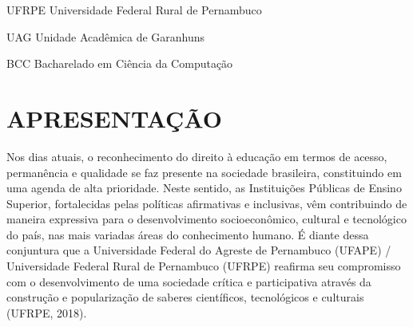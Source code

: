 \documentclass[
	12pt,				%
	openright,			%
  oneside,     %
	a4paper,			%
	english,			%
	french,				%
	spanish,			%
	brazil				%
	]{abntex2}
\begin{document}
\newpage


\frenchspacing 

\listoffigures*
\cleardoublepage

\listoftables*
\cleardoublepage

\begin{siglas}
  \item[UFRPE] Universidade Federal Rural de Pernambuco
  \item[UAG] Unidade Acadêmica de Garanhuns
  \item[BCC] Bacharelado em Ciência da Computação
\end{siglas}


\tableofcontents*
\cleardoublepage



\textual


\chapter*{APRESENTAÇÃO}

Nos dias atuais, o reconhecimento do direito à educação em termos de acesso, permanência e qualidade se faz presente na sociedade brasileira, constituindo em uma agenda de alta prioridade. Neste sentido, as Instituições Públicas de Ensino Superior, fortalecidas pelas políticas afirmativas e inclusivas, vêm contribuindo de maneira expressiva para o desenvolvimento socioeconômico, cultural e tecnológico do país, nas mais variadas áreas do conhecimento humano. É diante dessa conjuntura que a Universidade Federal do Agreste de Pernambuco (UFAPE) / Universidade Federal Rural de Pernambuco (UFRPE) reafirma seu compromisso com o desenvolvimento de uma sociedade crítica e participativa através da construção e popularização de saberes científicos, tecnológicos e culturais (UFRPE, 2018).
\end{document}
